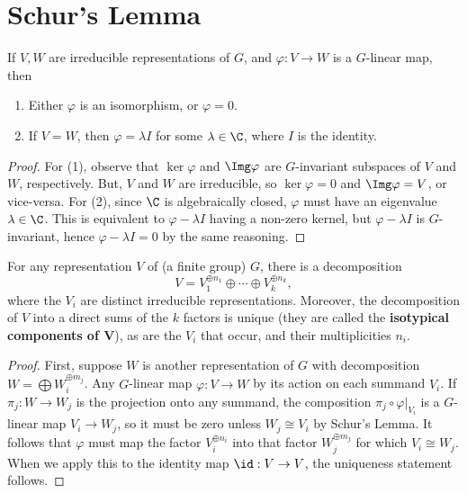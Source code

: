 \section{Schur's Lemma}

\begin{lem}
    If $V,W$ are irreducible representations of $G$, and $\varphi :V \to W$ is a $G$-linear map, then
    \begin{enumerate}[(1)]
        \item Either $\varphi$ is an isomorphism, or $\varphi=0$.
        \item If $V=W$, then $\varphi = \lambda I$ for some $\lambda \in \C$, where $I$ is the identity.
    \end{enumerate}
\end{lem}

\begin{proof}
For (1), observe that $\ker \varphi$ and $\Img \varphi$ are $G$-invariant subspaces of $V$ and $W$, respectively. But, $V$ and $W$ are irreducible, so $\ker \varphi =0$ and $\Img \varphi = V$, or vice-versa. For (2), since $\C$ is algebraically closed, $\varphi$ must have an eigenvalue $\lambda \in \C$. This is equivalent to $\varphi - \lambda I$ having a non-zero kernel, but $\varphi - \lambda I$ is $G$-invariant, hence $\varphi - \lambda I=0$ by the same reasoning.
\end{proof}

\begin{thm}
    For any representation $V$ of (a finite group) $G$, there is a decomposition
    $$V= V_1^{\oplus n_1}\oplus \cdots \oplus V_k^{\oplus n_k},$$
    where the $V_i$ are distinct irreducible representations. Moreover, the decomposition of $V$ into a direct sums of the $k$ factors is unique (they are called the \textbf{isotypical components of $\bm V$}), as are the $V_i$ that occur, and their multiplicities $n_i$.
\end{thm}

\begin{proof}
First, suppose $W$ is another representation of $G$ with decomposition $W=\bigoplus W_i^{\oplus m_j}$. Any $G$-linear map $\varphi :V \to W$ by its action on each summand $V_i$. If $\pi _j:W \to W_j$ is the projection onto any summand, the composition $\pi_j \circ \varphi|_{V_i}$ is a $G$-linear map $V_i \to W_j$, so it must be zero unless $W_j \cong V_i$ by Schur's Lemma. It follows that $\varphi$ must map the factor $V_i^{\oplus n_i}$ into that factor $W_j^{\oplus m_j}$ for which $V_i \cong W_j$. When we apply this to the identity map $\id :V \to V$, the uniqueness statement follows.
\end{proof}

